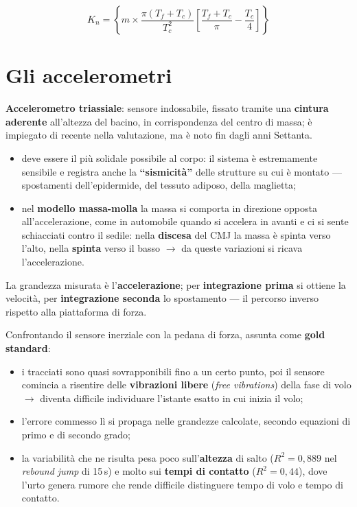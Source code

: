 \[ K_n = \left\{ m \times \frac{\pi (T_f + T_c)}{T_c^2} \left[ \frac{T_f + T_c}{\pi} -
  \frac{T_c}{4} \right] \right\} \]

\section{Gli accelerometri}

\textbf{Accelerometro triassiale}: sensore indossabile, fissato tramite una \textbf{cintura
aderente} all'altezza del bacino, in corrispondenza del centro di massa; è impiegato di recente
nella valutazione, ma è noto fin dagli anni Settanta.

\begin{itemize}
  \item deve essere il più solidale possibile al corpo: il sistema è estremamente sensibile e
    registra anche la \textbf{``sismicità''} delle strutture su cui è montato --- spostamenti
    dell'epidermide, del tessuto adiposo, della maglietta;
  \item nel \textbf{modello massa-molla} la massa si comporta in direzione opposta
    all'accelerazione, come in automobile quando si accelera in avanti e ci si sente schiacciati
    contro il sedile: nella \textbf{discesa} del CMJ la massa è spinta verso l'alto, nella
    \textbf{spinta} verso il basso $\rightarrow$ da queste variazioni si ricava l'accelerazione.
\end{itemize}

La grandezza misurata è l'\textbf{accelerazione}; per \textbf{integrazione prima} si ottiene la
velocità, per \textbf{integrazione seconda} lo spostamento --- il percorso inverso rispetto alla
piattaforma di forza.

Confrontando il sensore inerziale con la pedana di forza, assunta come \textbf{gold standard}:
\begin{itemize}
  \item i tracciati sono quasi sovrapponibili fino a un certo punto, poi il sensore comincia a
    risentire delle \textbf{vibrazioni libere} (\textit{free vibrations}) della fase di volo
    $\rightarrow$ diventa difficile individuare l'istante esatto in cui inizia il volo;
  \item l'errore commesso lì si propaga nelle grandezze calcolate, secondo equazioni di primo e di
    secondo grado;
  \item la variabilità che ne risulta pesa poco sull'\textbf{altezza} di salto ($R^2 = 0,889$ nel
    \textit{rebound jump} di 15\,s) e molto sui \textbf{tempi di contatto} ($R^2 = 0,44$), dove
    l'urto genera rumore che rende difficile distinguere tempo di volo e tempo di contatto.
\end{itemize}

